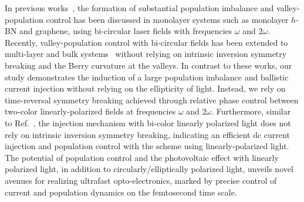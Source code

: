 In previous works~\cite{Jimenez-Galan2020,Mrudul:21,PhysRevLett.127.126601}, the formation of substantial population imbalance and valley-population control has been discussed in monolayer systems such as monolayer $h$-BN and graphene, using bi-circular laser fields with frequencies $\omega$ and $2\omega$. Recently, valley-population control with bi-circular fields has been extended to multi-layer and bulk systems~\cite{tyulnev2023valleytronics} without relying on intrinsic inversion symmetry breaking and the Berry curvature at the valleys. In contrast to these works, our study demonstrates the induction of a large population imbalance and ballistic current injection without relying on the ellipticity of light. Instead, we rely on time-reversal symmetry breaking achieved through relative phase control between two-color linearly-polarized fields at frequencies $\omega$ and $2\omega$. Furthermore, similar to Ref.~\cite{tyulnev2023valleytronics}, the injection mechanism with bi-color linearly polarized light does not rely on intrinsic inversion symmetry breaking, indicating an efficient dc current injection and population control with the scheme using linearly-polarized light. The potential of population control and the photovoltaic effect with linearly polarized light, in addition to circularly/elliptically polarized light, unveils novel avenues for realizing ultrafast opto-electronics, marked by precise control of current and population dynamics on the femtosecond time scale.

